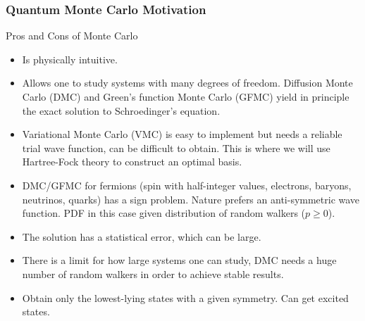 \documentclass{beamer}
\begin{document}
\begin{frame}
\frametitle{Quantum Monte Carlo Motivation}

\begin{block}{Pros and Cons of Monte Carlo }
\begin{itemize}
\item Is physically intuitive.

\item Allows one to study systems with many degrees of freedom. Diffusion Monte Carlo (DMC) and Green's function Monte Carlo (GFMC) yield in principle the exact solution to Schroedinger's equation.

\item Variational Monte Carlo (VMC) is easy  to implement but needs a reliable trial wave function, can be difficult to obtain.  This is where we will use Hartree-Fock theory to construct an optimal basis.

\item DMC/GFMC for fermions (spin with half-integer values, electrons, baryons, neutrinos, quarks)  has a sign problem. Nature prefers an anti-symmetric wave function. PDF in this case given distribution of random walkers ($p\ge 0$).

\item The solution has a statistical error, which can be large. 

\item There is a limit for how large systems one can study, DMC needs a huge number of random walkers in order to achieve stable results. 

\item Obtain only the lowest-lying states with a given symmetry. Can get excited states.
\end{itemize}

\noindent
\end{block}
\end{frame}
\end{document}
